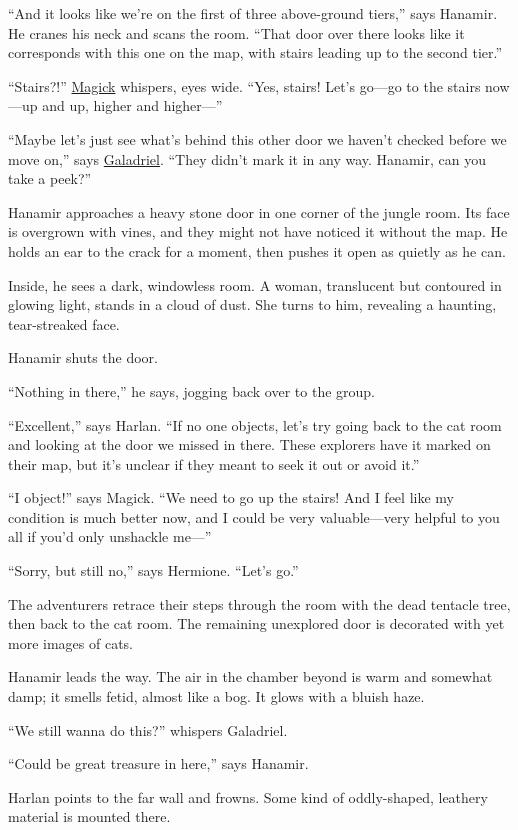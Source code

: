 \documentclass[smalldemyvopaper,11pt,twoside,onecolumn,openright,extrafontsizes]{memoir}
\begin{document}
``And it looks like we're on the first of three above-ground tiers,''
says Hanamir. He cranes his neck and scans the room. ``That door over
there looks like it corresponds with this one on the map, with stairs
leading up to the second tier.''

``Stairs?!'' \href{/characters/magick/}{Magick} whispers, eyes wide.
``Yes, stairs! Let's go---go to the stairs now---up and up, higher and
higher---''

``Maybe let's just see what's behind this other door we haven't checked
before we move on,'' says \href{/characters/galadriel/}{Galadriel}.
``They didn't mark it in any way. Hanamir, can you take a peek?''

Hanamir approaches a heavy stone door in one corner of the jungle room.
Its face is overgrown with vines, and they might not have noticed it
without the map. He holds an ear to the crack for a moment, then pushes
it open as quietly as he can.

Inside, he sees a dark, windowless room. A woman, translucent but
contoured in glowing light, stands in a cloud of dust. She turns to him,
revealing a haunting, tear-streaked face.

Hanamir shuts the door.

``Nothing in there,'' he says, jogging back over to the group.

``Excellent,'' says Harlan. ``If no one objects, let's try going back to
the cat room and looking at the door we missed in there. These explorers
have it marked on their map, but it's unclear if they meant to seek it
out or avoid it.''

``I object!'' says Magick. ``We need to go up the stairs! And I feel
like my condition is much better now, and I could be very
valuable---very helpful to you all if you'd only unshackle me---''

``Sorry, but still no,'' says Hermione. ``Let's go.''

The adventurers retrace their steps through the room with the dead
tentacle tree, then back to the cat room. The remaining unexplored door
is decorated with yet more images of cats.

Hanamir leads the way. The air in the chamber beyond is warm and
somewhat damp; it smells fetid, almost like a bog. It glows with a
bluish haze.

``We still wanna do this?'' whispers Galadriel.

``Could be great treasure in here,'' says Hanamir.

Harlan points to the far wall and frowns. Some kind of oddly-shaped,
leathery material is mounted there.
\end{document}
